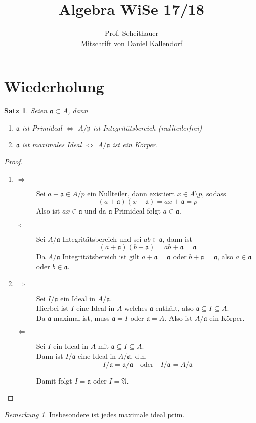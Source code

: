 \documentclass[10pt,a4paper]{article}
\title{Algebra WiSe 17/18}
\author{Prof. Scheithauer\\
Mitschrift von Daniel Kallendorf}
\theoremstyle{plain}
\newtheorem{satz}[theorem]{Satz}
\theoremstyle{definition}
\theoremstyle{remark}
\newtheorem*{bem*}{Bemerkung}
\begin{document}
	
	\maketitle
	\tableofcontents
	
	\section{Wiederholung}
	
	\begin{satz}
		Seien $\mathfrak a\subset A$, dann
		\begin{enumerate}
			\item $\mathfrak a$ ist Primideal $\Leftrightarrow$ $A/\mathfrak p$ ist Integritätsbereich (nullteilerfrei)
			\item $\mathfrak a$ ist maximales Ideal $\Leftrightarrow$ $A/\mathfrak a$ ist ein Körper.
		\end{enumerate}
	\end{satz}
	\begin{proof}
		\begin{enumerate}
			\item \begin{description}
				\item[$\Rightarrow$] Sei $a+\mathfrak a\in A/p$ ein Nullteiler, dann existiert $x\in A\setminus p$, sodass
				\[(a+\mathfrak a)(x+\mathfrak a)=ax+\mathfrak a=p\]
				Also ist $ax\in \mathfrak a$ und da $\mathfrak a$ Primideal folgt $a\in\mathfrak a$.
				\item[$\Leftarrow$] Sei $A/\mathfrak a$ Integritätsbereich und sei $ab\in\mathfrak a$, dann ist
				\[(a+\mathfrak a)(b+\mathfrak a)=ab+\mathfrak a=\mathfrak a\]
				Da $A/\mathfrak a$ Integritätsbereich ist gilt $a+\mathfrak a=\mathfrak a$ oder $b+\mathfrak a=\mathfrak a$, also $a\in\mathfrak a$ oder $b\in\mathfrak a$.
			\end{description}
			\item \begin{description}
				\item[$\Rightarrow$] Sei $I/\mathfrak a$ ein Ideal in $A/\mathfrak a$.\\
				Hierbei ist $I$ eine Ideal in $A$ welches $\mathfrak a$ enthält, also $\mathfrak a\subseteq I\subseteq A$.\\
				Da $\mathfrak a$ maximal ist, muss $\mathfrak a=I$ oder $\mathfrak a=A$. Also ist $A/\mathfrak a$ ein Körper.
				\item[$\Leftarrow$] Sei $I$ ein Ideal in $A$ mit $\mathfrak a\subseteq I\subseteq A$.\\
				Dann ist $I/\mathfrak a$ eine Ideal in $A/\mathfrak a$, d.h.
				\[I/\mathfrak a=\mathfrak a/\mathfrak a\quad\text{oder}\quad I/\mathfrak a=A/\mathfrak a\]
				
				Damit folgt $I=\mathfrak a$ oder $I=\mathfrak A$.
			\end{description}
		\end{enumerate}
	\end{proof}
	\begin{bem*}
		Insbesondere ist jedes maximale ideal prim.
	\end{bem*}
\end{document}
